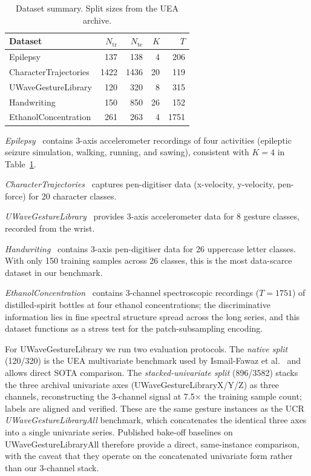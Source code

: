 \documentclass[conference,compsoc]{IEEEtran}
\begin{document}
\begin{table}[t]
\caption{Dataset summary. Split sizes from the UEA archive.}
\label{tab:datasets}
\centering
\begin{tabular}{lrrrr}
\toprule
Dataset & $N_\text{tr}$ & $N_\text{te}$ & $K$ & $T$ \\
\midrule
Epilepsy             & 137  & 138  & 4  & 206 \\
CharacterTrajectories& 1422 & 1436 & 20 & 119 \\
UWaveGestureLibrary  & 120  & 320  & 8  & 315 \\
Handwriting          & 150  & 850  & 26 & 152 \\
EthanolConcentration & 261  & 263  & 4  & 1751 \\
\bottomrule
\end{tabular}
\end{table}

\textit{Epilepsy}~\cite{bagnall2018uea} contains 3-axis accelerometer
recordings of four activities (epileptic seizure simulation, walking,
running, and sawing), consistent with $K = 4$ in
Table~\ref{tab:datasets}.

\textit{CharacterTrajectories}~\cite{bagnall2018uea} captures
pen-digitiser data (x-velocity, y-velocity, pen-force) for 20
character classes.

\textit{UWaveGestureLibrary}~\cite{bagnall2018uea} provides
3-axis accelerometer data for 8 gesture classes, recorded from
the wrist.

\textit{Handwriting}~\cite{bagnall2018uea} contains 3-axis
pen-digitiser data for 26 uppercase letter classes.
With only 150 training samples across 26 classes, this is the
most data-scarce dataset in our benchmark.

\textit{EthanolConcentration}~\cite{bagnall2018uea} contains 3-channel
spectroscopic recordings ($T = 1751$) of distilled-spirit bottles at
four ethanol concentrations; the discriminative information lies in
fine spectral structure spread across the long series, and this
dataset functions as a stress test for the patch-subsampling encoding.

For UWaveGestureLibrary we run two evaluation protocols.
The \textit{native split} (120/320) is the UEA multivariate
benchmark used by Ismail-Fawaz et al.~\cite{ismail2025lite} and
allows direct SOTA comparison.
The \textit{stacked-univariate split} (896/3582) stacks the three
archival univariate axes (UWaveGestureLibraryX/Y/Z) as three channels,
reconstructing the 3-channel signal at 7.5$\times$ the training sample
count; labels are aligned and verified.
These are the same gesture instances as the UCR
\textit{UWaveGestureLibraryAll} benchmark, which concatenates the
identical three axes into a single univariate series. Published
bake-off baselines on UWaveGestureLibraryAll therefore provide a
direct, same-instance comparison, with the caveat that they operate on
the concatenated univariate form rather than our 3-channel stack.
\end{document}
